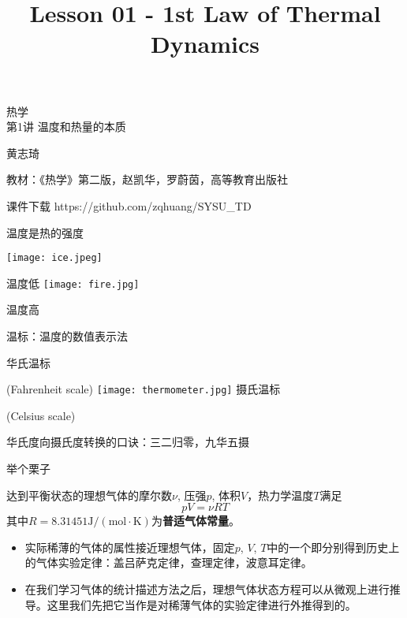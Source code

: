 \documentclass[CJK]{beamer}
\title{Lesson 01 - 1st Law of Thermal Dynamics}
\author{}
\date{}
\begin{document}
\begin{frame}
\begin{center}
\begin{Large}
\bch
热学 \\
第1讲 温度和热量的本质

{\vskip 0.3in}

黄志琦

\ech
\end{Large}
\end{center}

\vskip 0.2in

\bch
教材：《热学》第二版，赵凯华，罗蔚茵，高等教育出版社
\ech

\bch
课件下载
\ech
https://github.com/zqhuang/SYSU\_TD
\end{frame}


\begin{frame}
\bch
温度是热的强度

\texttt{[image: ice.jpeg]}

温度低
\emini
{}
\texttt{[image: fire.jpg]}

温度高
\emini
\ech
\end{frame}


\begin{frame}
\bch
温标：温度的数值表示法

\skiplines

华氏温标

(Fahrenheit scale)
\emini
{}
\texttt{[image: thermometer.jpg]}
\emini
{}
摄氏温标

(Celsius scale)
\emini

华氏度向摄氏度转换的口诀：三二归零，九华五摄
\ech
\end{frame}

\begin{frame}
\bch
举个栗子

\ech
\end{frame}


\begin{frame}
\bch
达到平衡状态的理想气体的摩尔数$\nu$, 压强$p$, 体积$V$，热力学温度$T$满足
{\color{blue}
$$p V = \nu RT$$
}
其中$R=8.31451 \mathrm{J/(mol\cdot K)}$为{\bf 普适气体常量}。

{\scriptsize
\begin{itemize}
\item{实际稀薄的气体的属性接近理想气体，固定$p$, $V$, $T$中的一个即分别得到历史上的气体实验定律：盖吕萨克定律，查理定律，波意耳定律。}
\item{在我们学习气体的统计描述方法之后，理想气体状态方程可以从微观上进行推导。这里我们先把它当作是对稀薄气体的实验定律进行外推得到的。}
\end{itemize}
}
\ech
\end{frame}
\end{document}
